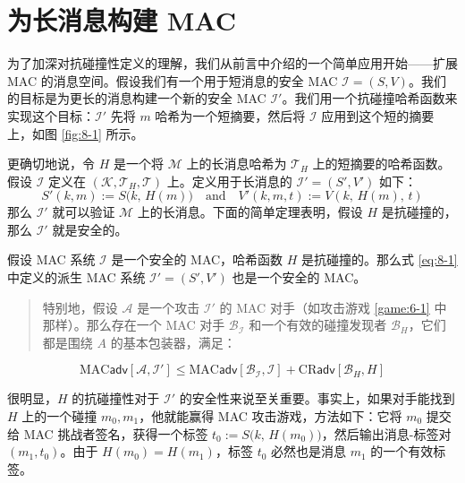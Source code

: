 \section{为长消息构建 MAC}\label{sec:8-2}

为了加深对抗碰撞性定义的理解，我们从前言中介绍的一个简单应用开始——扩展 MAC 的消息空间。假设我们有一个用于短消息的安全 MAC $\mathcal{I}=(S,V)$。我们的目标是为更长的消息构建一个新的安全 MAC $\mathcal{I}'$。我们用一个抗碰撞哈希函数来实现这个目标：$\mathcal{I}'$ 先将 $m$ 哈希为一个短摘要，然后将 $\mathcal{I}$ 应用到这个短的摘要上，如图 \ref{fig:8-1} 所示。

更确切地说，令 $H$ 是一个将 $\mathcal{M}$ 上的长消息哈希为 $\mathcal{T}_H$ 上的短摘要的哈希函数。假设 $\mathcal{I}$ 定义在 $(\mathcal{K},\mathcal{T}_H,\mathcal{T})$ 上。定义用于长消息的 $\mathcal{I}'=(S',V')$ 如下：
\begin{equation}\label{eq:8-1}
S'(k,m):=S\big(k,\,H(m)\big)
\quad\text{and}\quad
V'(k,m,t):=V(k,\,H(m),\,t)
\end{equation}
那么 $\mathcal{I}'$ 就可以验证 $\mathcal{M}$ 上的长消息。下面的简单定理表明，假设 $H$ 是抗碰撞的，那么 $\mathcal{I}'$ 就是安全的。

\begin{theorem}\label{theo:8-1}
假设 MAC 系统 $\mathcal{I}$ 是一个安全的 MAC，哈希函数 $H$ 是抗碰撞的。那么式 \ref{eq:8-1} 中定义的派生 MAC 系统 $\mathcal{I}'=(S',V')$ 也是一个安全的 MAC。
\begin{quote}
特别地，假设 $\mathcal{A}$ 是一个攻击 $\mathcal{I}'$ 的 MAC 对手（如攻击游戏 \ref{game:6-1} 中那样）。那么存在一个 MAC 对手 $\mathcal{B}_\mathcal{I}$ 和一个有效的碰撞发现者 $\mathcal{B}_H$，它们都是围绕 $A$ 的基本包装器，满足：
\end{quote}
\[
\mathrm{MAC}\mathsf{adv}[\mathcal{A},\mathcal{I}']\leq
\mathrm{MAC}\mathsf{adv}[\mathcal{B}_\mathcal{I},\mathcal{I}]+
\mathrm{CR}\mathsf{adv}[\mathcal{B}_H,H]
\]
\end{theorem}

很明显，$H$ 的抗碰撞性对于 $\mathcal{I}'$ 的安全性来说至关重要。事实上，如果对手能找到 $H$ 上的一个碰撞 $m_0,m_1$，他就能赢得 MAC 攻击游戏，方法如下：它将 $m_0$ 提交给 MAC 挑战者签名，获得一个标签 $t_0:=S\big(k,\,H(m_0)\big)$，然后输出消息-标签对 $(m_1,t_0)$。由于 $H(m_0)=H(m_1)$，标签 $t_0$ 必然也是消息 $m_1$ 的一个有效标签。

